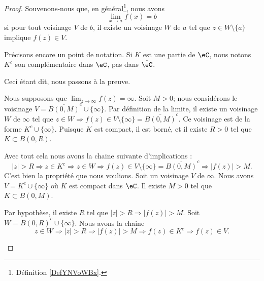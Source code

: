 \begin{proof}
	Souvenons-nous que, en général\footnote{Définition \ref{DefYNVoWBx}.}, nous avons
	\begin{equation}
		\lim_{x\to a} f(x)=b
	\end{equation}
	si pour tout voisinage \( V\) de \( b\), il existe un voisinage \( W\) de \( a\) tel que \( z\in W\setminus\{ a \}\) implique \( f(z)\in V\).

	Précisons encore un point de notation. Si \( K\) est une partie de \( \eC\), nous notons \( K^c\) son complémentaire dans \( \eC\), pas dans \( \hat  \eC\).

	Ceci étant dit, nous passons à la preuve.
	\begin{subproof}
		Nous supposons que \( \lim_{z\to \infty} f(z)=\infty\). Soit \( M>0\); nous considérons le voisinage \( V=\overline{ B(0,M) }^c\cup\{ \infty \}\). Par définition de la limite, il existe un voisinage \( W\) de \( \infty\) tel que \( z\in W\Rightarrow f(z)\in V\setminus\{ \infty \}=\overline{ B(0,M) }^c\). Ce voisinage est de la forme \( K^c\cup\{ \infty \}\). Puisque \( K\) est compact, il est borné, et il existe \( R>0\) tel que \( K\subset B(0,R)\).

		Avec tout cela nous avons la chaine suivante d'implications :
		\begin{equation}
			| z |>R\Rightarrow z\in K^c\Rightarrow z\in W\Rightarrow f(z)\in V\setminus\{ \infty \}=\overline{ B(0,M) }^c\Rightarrow | f(z) |>M.
		\end{equation}
		C'est bien la propriété que nous voulions.
		Soit un voisinage \( V\) de \( \infty\). Nous avons \( V=K^c\cup\{ \infty \}\) où \( K\) est compact dans \( \eC\). Il existe \( M>0\) tel que \( K\subset B(0,M)\).

		Par hypothèse, il existe \( R\) tel que \( | z |>R\Rightarrow | f(z) |>M\). Soit \( W=\overline{ B(0,R) }^c\cup\{ \infty \}\). Nous avons la chaine
		\begin{equation}
			z\in W\Rightarrow| z |>R\Rightarrow| f(z) |>M\Rightarrow f(z)\in K^c\Rightarrow f(z)\in V.
		\end{equation}
	\end{subproof}
\end{proof}


